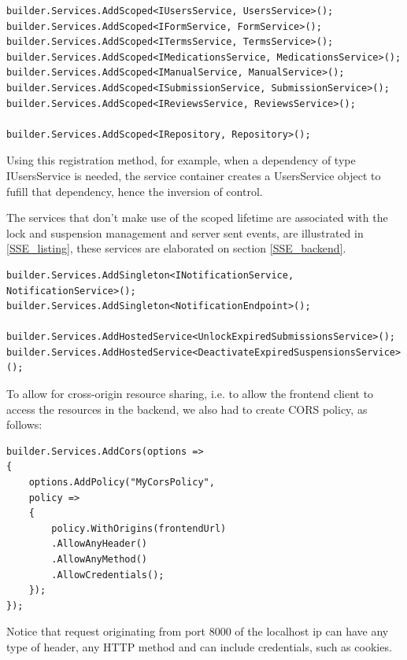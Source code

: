 \begin{lstlisting}[style=sharpc, caption={Registering Scoped Services in ASP.NET Core Dependency Injection Container.}, label={DI}]
builder.Services.AddScoped<IUsersService, UsersService>();
builder.Services.AddScoped<IFormService, FormService>();
builder.Services.AddScoped<ITermsService, TermsService>();
builder.Services.AddScoped<IMedicationsService, MedicationsService>();
builder.Services.AddScoped<IManualService, ManualService>();
builder.Services.AddScoped<ISubmissionService, SubmissionService>();
builder.Services.AddScoped<IReviewsService, ReviewsService>();

builder.Services.AddScoped<IRepository, Repository>();
\end{lstlisting}

Using this registration method, for example, when a dependency of type IUsersService is needed, the service container creates a UsersService object to fufill that dependency, hence the inversion of control.

The services that don't make use of the scoped lifetime are associated with the lock and suspension management and server sent events, are illustrated in \ref{SSE_listing}, these services are elaborated on section \ref{SSE_backend}.

\begin{lstlisting}[style=sharpc, caption={Registering Scoped Services in ASP.NET Core Dependency Injection Container:}, label={SSE_listing}]
builder.Services.AddSingleton<INotificationService, NotificationService>();
builder.Services.AddSingleton<NotificationEndpoint>();

builder.Services.AddHostedService<UnlockExpiredSubmissionsService>();
builder.Services.AddHostedService<DeactivateExpiredSuspensionsService>();
\end{lstlisting}

To allow for cross-origin resource sharing, i.e. to allow the frontend client to access the resources in the backend, we also had to create CORS policy, as follows:

\begin{lstlisting}[style=sharpc, caption={Configuring CORS Policy in ASP.NET Core: Allowing Specific Origin with Full Access Control.}]
builder.Services.AddCors(options =>
{
	options.AddPolicy("MyCorsPolicy",
	policy =>
	{
		policy.WithOrigins(frontendUrl)
		.AllowAnyHeader()
		.AllowAnyMethod()
		.AllowCredentials();
	});
});
\end{lstlisting}

Notice that request originating from port 8000 of the localhost ip can have any type of header, any HTTP method and can include credentials, such as cookies.
\newpage

